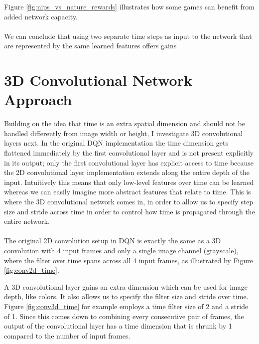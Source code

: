 Figure \ref{fig:nips_vs_nature_rewards}
illustrates how some games can benefit
from added network capacity.

\paragraph{}
We can conclude that using two separate time steps
as input to the network
that are represented by the same learned features
offers gains


\section{3D Convolutional Network Approach}
\label{sec:3d_convolutional_network_approach}
Building on the idea that time is an extra spatial dimension
and should not be handled differently
from image width or height,
I investigate 3D convolutional layers next.
In the original DQN implementation
the time dimension gets flattened immediately
by the first convolutional layer
and is not present explicitly
in its output;
only the first convolutional layer
has explicit access to time
because the 2D convolutional layer implementation
extends along the entire depth of the input.
Intuitively this means that only low-level
features over time can be learned
whereas we can easily imagine
more abstract features
that relate to time.
This is where the 3D convolutional network comes in,
in order to allow us to specify step size and stride across time
in order to control how time is propagated through the entire network.

\paragraph{}
The original 2D convolution setup in DQN
is exactly the same as a 3D convolution
with 4 input frames and only a single image channel (grayscale),
where the filter over time spans across all 4 input frames,
as illustrated by Figure \ref{fig:conv2d_time}.

A 3D convolutional layer gains an extra dimension
which can be used for image depth, like colors.
It also allows us to specify the filter size and stride over time.
Figure \ref{fig:conv3d_time} for example
employs a time filter size of 2 and a stride of 1.
Since this comes down to combining every consecutive pair of frames,
the output of the convolutional layer has a time dimension
that is shrunk by 1 compared to the number of input frames.

